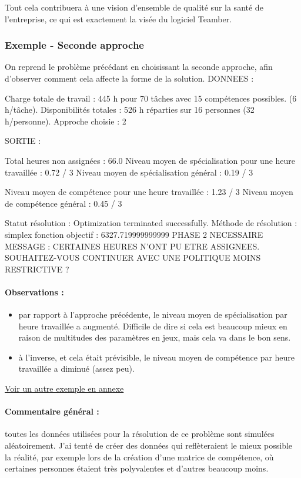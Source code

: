 \documentclass[12pt]{article}
\newenvironment{code}%
   {\snugshade\verbatim}%
   {\endverbatim\endsnugshade}
\begin{document}
Tout cela contribuera à une vision d'ensemble de qualité sur la santé de l'entreprise, ce qui est exactement la visée du logiciel Teamber.

\newpage
\subsubsection{Exemple - Seconde approche}
On reprend le problème précédant en choisissant la seconde approche, afin d'observer comment cela affecte la forme de la solution.
\begin{code}
DONNEES :

Charge totale de travail   : 445 h pour 70 tâches avec 15 compétences possibles.
							 (6 h/tâche).
Disponibilités totales     : 526 h réparties sur 16 personnes 
							 (32 h/personne).
Approche choisie : 2

SORTIE :

Total heures non assignées : 66.0
Niveau moyen de spécialisation pour une heure travaillée : 0.72 / 3
Niveau moyen de spécialisation général : 0.19 / 3

Niveau moyen de compétence pour une heure travaillée     : 1.23 / 3
Niveau moyen de compétence général : 0.45 / 3

Statut résolution : Optimization terminated successfully.
Méthode de résolution      : simplex
fonction objectif          : 6327.719999999999
PHASE 2 NECESSAIRE
MESSAGE : CERTAINES HEURES N'ONT PU ETRE ASSIGNEES. SOUHAITEZ-VOUS CONTINUER 
          AVEC UNE POLITIQUE MOINS RESTRICTIVE ?
\end{code}
\hypertarget{ref12}{}
\paragraph{Observations :}
\begin{itemize}
\item par rapport à l'approche précédente, le niveau moyen de spécialisation par heure travaillée a augmenté. Difficile de dire si cela est beaucoup mieux en raison de multitudes des paramètres en jeux, mais cela va dans le bon sens.
\item à l'inverse, et cela était prévisible, le niveau moyen de compétence par heure travaillée a diminué (assez peu).\\
\end{itemize}
\hyperlink{Ref10}{Voir un autre exemple en annexe} \\

\paragraph{Commentaire général :}
toutes les données utilisées pour la résolution de ce problème sont simulées aléatoirement. J'ai tenté de créer des données qui reflèteraient le mieux possible la réalité, par exemple lors de la création d'une matrice de compétence, où certaines personnes étaient très polyvalentes et d'autres beaucoup moins.\\
\end{document}
